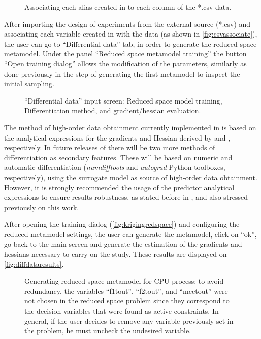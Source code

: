 \documentclass[../../msc-thesis.tex]{subfiles}
\begin{document}
\begin{figure}[htb]
	\centering
	\caption{Associating each alias created in \mtc to each column
	of the *.csv data.}
	\label{fig:csvassociate}
\end{figure}

After importing the design of experiments from the external source (*.csv) 
and associating each variable created in \mtc with the data (as shown in 
\autoref{fig:csvassociate}), the user can go to ``Differential data'' tab, 
in order to generate the reduced space metamodel. Under the panel 
``Reduced space metamodel training'' the button ``Open training dialog'' 
allows the modification of the \kriging parameters, similarly as done 
previously in the step of generating the first metamodel to inspect the 
initial sampling.

\begin{figure}[htb]
	\centering
    \caption{``Differential data'' input screen: Reduced space model 
    training, Differentiation method, and gradient/hessian evaluation.}
	\label{fig:diffdatainput}
\end{figure}

The method of high-order data obtainment currently implemented in 
\mtc is based on the analytical expressions for the gradients 
and Hessian derived by \textcite{Lophaven2002} and \textcite{Alves2018}, 
respectively. In future releases of \mtc there will be two more methods 
of differentiation as secondary features. These will be based on numeric 
and automatic differentiation (\textit{numdifftools} and \textit{autograd} 
Python toolboxes, respectively), using the surrogate model as source of 
high-order data obtainment. However, it is strongly recommended the usage 
of the \kriging predictor analytical expressions to ensure results 
robustness, as stated before in \textcite{Alves2018}, and also stressed 
previously on this work.

After opening the training dialog (\autoref{fig:krigingredspace}) and 
configuring the reduced metamodel settings, the user can generate the 
metamodel, click on ``ok'', go back to the main screen and generate the 
estimation of the gradients and hessians necessary to carry on the \soc study.
These results are displayed on \autoref{fig:diffdataresults}.

\begin{figure}[htb]
	\centering
	\caption{Generating reduced space metamodel for CPU process: to avoid
    redundancy, the variables ``f1tout'', ``f2tout'', and ``mcctout'' were 
    not chosen in the reduced space problem since they correspond to the 
    decision variables that were found as active constraints. In general, 
    if the user decides to remove any variable previously set in the 
    problem, he must uncheck the undesired variable.}
	\label{fig:krigingredspace}
\end{figure}
\end{document}
